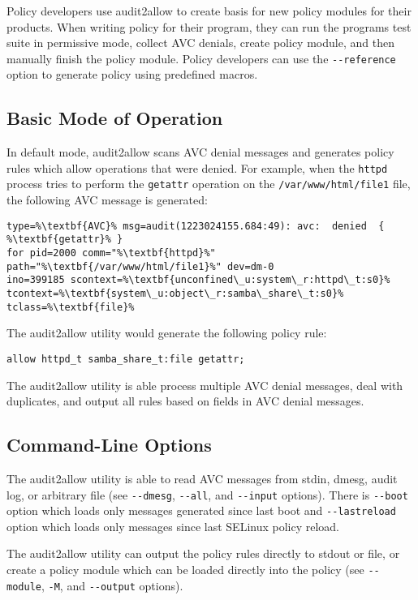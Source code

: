 Policy developers use audit2allow to create basis for new policy modules for
their products. When writing policy for their program, they can run the
programs test suite in permissive mode, collect AVC denials, create policy
module, and then manually finish the policy module. Policy developers can use
the \texttt{-{}-reference} option to generate policy using predefined macros.

\subsection{Basic Mode of Operation}
In default mode, audit2allow scans AVC denial messages and generates policy
rules which allow operations that were denied. For example, when the
\texttt{httpd} process tries to perform the \texttt{getattr} operation on the
\texttt{/var/www/html/file1} file, the following AVC message is generated:
\begin{lstlisting}[escapechar=\%]
type=%\textbf{AVC}% msg=audit(1223024155.684:49): avc:  denied  { %\textbf{getattr}% }
for pid=2000 comm="%\textbf{httpd}%" path="%\textbf{/var/www/html/file1}%" dev=dm-0
ino=399185 scontext=%\textbf{unconfined\_u:system\_r:httpd\_t:s0}%
tcontext=%\textbf{system\_u:object\_r:samba\_share\_t:s0}% tclass=%\textbf{file}%
\end{lstlisting}
The audit2allow utility would generate the following policy rule:
\begin{lstlisting}
allow httpd_t samba_share_t:file getattr;
\end{lstlisting}
The audit2allow utility is able process multiple AVC denial messages, deal with
duplicates, and output all rules based on fields in AVC denial messages.

\subsection{Command-Line Options}
The audit2allow utility is able to read AVC messages from stdin, dmesg, audit
log, or arbitrary file (see \texttt{-{}-dmesg}, \texttt{-{}-all}, and
\texttt{-{}-input} options). There is \texttt{-{}-boot} option which loads only
messages generated since last boot and \texttt{-{}-lastreload} option which
loads only messages since last SELinux policy reload.

The audit2allow utility can output the policy rules directly to stdout or file,
or create a policy module which can be loaded directly into the policy (see
\texttt{-{}-module}, \texttt{-M}, and \texttt{-{}-output} options).

